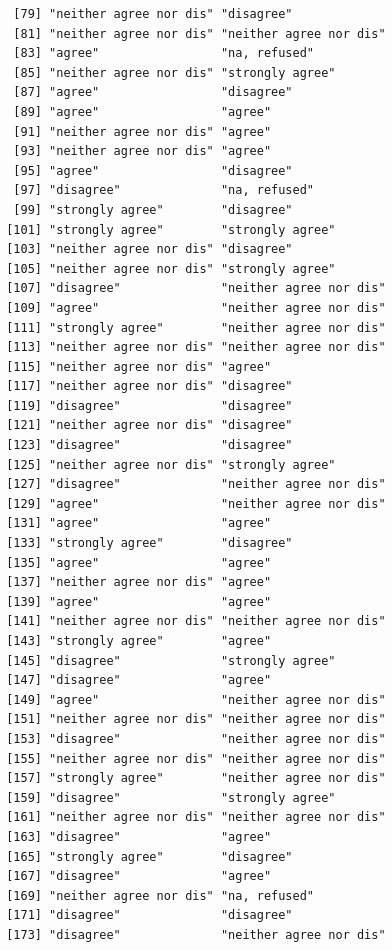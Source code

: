 \documentclass{beamer}\usepackage[]{graphicx}\usepackage[]{color}
\makeatletter
\newenvironment{kframe}{%
 \def\at@end@of@kframe{}%
 \ifinner\ifhmode%
  \def\at@end@of@kframe{\end{minipage}}%
  \begin{minipage}{\columnwidth}%
 \fi\fi%
 \def\FrameCommand##1{\hskip\@totalleftmargin \hskip-\fboxsep
 \colorbox{shadecolor}{##1}\hskip-\fboxsep
     \hskip-\linewidth \hskip-\@totalleftmargin \hskip\columnwidth}%
 \MakeFramed {\advance\hsize-\width
   \@totalleftmargin\z@ \linewidth\hsize
   \@setminipage}}%
 {\par\unskip\endMakeFramed%
 \at@end@of@kframe}
\newenvironment{knitrout}{}{} %
\makeatother
\begin{document}
\begin{frame}[fragile]
\begin{knitrout}
\begin{kframe}
\begin{verbatim}
  [79] "neither agree nor dis" "disagree"             
  [81] "neither agree nor dis" "neither agree nor dis"
  [83] "agree"                 "na, refused"          
  [85] "neither agree nor dis" "strongly agree"       
  [87] "agree"                 "disagree"             
  [89] "agree"                 "agree"                
  [91] "neither agree nor dis" "agree"                
  [93] "neither agree nor dis" "agree"                
  [95] "agree"                 "disagree"             
  [97] "disagree"              "na, refused"          
  [99] "strongly agree"        "disagree"             
 [101] "strongly agree"        "strongly agree"       
 [103] "neither agree nor dis" "disagree"             
 [105] "neither agree nor dis" "strongly agree"       
 [107] "disagree"              "neither agree nor dis"
 [109] "agree"                 "neither agree nor dis"
 [111] "strongly agree"        "neither agree nor dis"
 [113] "neither agree nor dis" "neither agree nor dis"
 [115] "neither agree nor dis" "agree"                
 [117] "neither agree nor dis" "disagree"             
 [119] "disagree"              "disagree"             
 [121] "neither agree nor dis" "disagree"             
 [123] "disagree"              "disagree"             
 [125] "neither agree nor dis" "strongly agree"       
 [127] "disagree"              "neither agree nor dis"
 [129] "agree"                 "neither agree nor dis"
 [131] "agree"                 "agree"                
 [133] "strongly agree"        "disagree"             
 [135] "agree"                 "agree"                
 [137] "neither agree nor dis" "agree"                
 [139] "agree"                 "agree"                
 [141] "neither agree nor dis" "neither agree nor dis"
 [143] "strongly agree"        "agree"                
 [145] "disagree"              "strongly agree"       
 [147] "disagree"              "agree"                
 [149] "agree"                 "neither agree nor dis"
 [151] "neither agree nor dis" "neither agree nor dis"
 [153] "disagree"              "neither agree nor dis"
 [155] "neither agree nor dis" "neither agree nor dis"
 [157] "strongly agree"        "neither agree nor dis"
 [159] "disagree"              "strongly agree"       
 [161] "neither agree nor dis" "neither agree nor dis"
 [163] "disagree"              "agree"                
 [165] "strongly agree"        "disagree"             
 [167] "disagree"              "agree"                
 [169] "neither agree nor dis" "na, refused"          
 [171] "disagree"              "disagree"             
 [173] "disagree"              "neither agree nor dis"

\end{verbatim}
\end{kframe}
\end{knitrout}
\end{frame}
\end{document}
